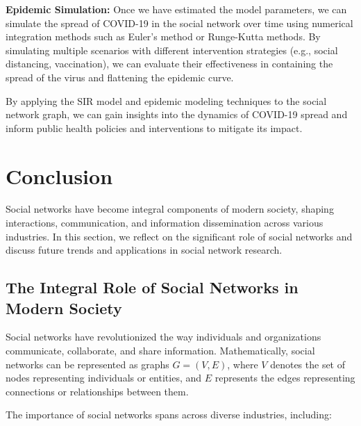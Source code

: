 \documentclass[12pt]{book} %
\begin{document}
\textbf{Epidemic Simulation:} Once we have estimated the model parameters, we can simulate the spread of COVID-19 in the social network over time using numerical integration methods such as Euler's method or Runge-Kutta methods. By simulating multiple scenarios with different intervention strategies (e.g., social distancing, vaccination), we can evaluate their effectiveness in containing the spread of the virus and flattening the epidemic curve.

By applying the SIR model and epidemic modeling techniques to the social network graph, we can gain insights into the dynamics of COVID-19 spread and inform public health policies and interventions to mitigate its impact.

\section{Conclusion}

Social networks have become integral components of modern society, shaping interactions, communication, and information dissemination across various industries. In this section, we reflect on the significant role of social networks and discuss future trends and applications in social network research.

\subsection{The Integral Role of Social Networks in Modern Society}

Social networks have revolutionized the way individuals and organizations communicate, collaborate, and share information. Mathematically, social networks can be represented as graphs \(G = (V, E)\), where \(V\) denotes the set of nodes representing individuals or entities, and \(E\) represents the edges representing connections or relationships between them.

The importance of social networks spans across diverse industries, including:
\end{document}
